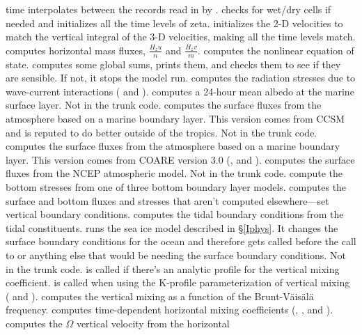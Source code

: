 \begin{klist}
   time interpolates between the records read in by
  .
   checks for wet/dry cells if needed and initializes
  all the time levels of zeta.
   initializes the 2-D velocities to match the
  vertical integral of the 3-D velocities, making all the time levels
  match.
   computes horizontal mass fluxes, $\frac{H_z
  u}{n}$ and $\frac{H_z v}{m}$.
   computes the nonlinear equation of state.
   computes some global sums, prints them, and checks them to
  see if they are sensible. If not, it stops the model run.
   computes the radiation stresses due to
  wave-current interactions (\cite{Mellor_2003} and \cite{Mellor_2005}).
   computes a 24-hour mean albedo at the marine
  surface layer. Not in the trunk code.
   computes the surface fluxes from the atmosphere
  based on a marine boundary layer. This version comes from CCSM and is
  reputed to do better outside of the tropics. Not in the trunk code.
   computes the surface fluxes from the atmosphere
  based on a marine boundary layer. This version comes from COARE
  version 3.0 (\cite{Fairall_2003}, \cite{Taylor_2001} and
  \cite{Oost_2002}).
   computes the surface fluxes from the NCEP
  atmospheric model. Not in the trunk code.
   compute the bottom stresses from one of three bottom
  boundary layer models.
   computes the surface and bottom fluxes and stresses
  that aren't computed elsewhere---set vertical boundary conditions.
   computes the tidal boundary conditions from the
  tidal constituents.
   runs the sea ice model described in \S\ref{Iphys}. It
  changes the surface boundary conditions for the ocean and therefore
  gets called before the call to  or anything else that
  would be needing the surface boundary conditions. Not in the trunk
  code.
   is called if there's an analytic profile for the
  vertical mixing coefficient.
   is called when using the K-profile parameterization
  of vertical mixing (\cite{Large94} and \cite{Large98}).
   computes the vertical mixing as a function of the
  Brunt-V\"ais\"al\"a frequency.
   computes time-dependent horizontal mixing coefficients
  (\cite{S63}, \cite{Holland_98}, \cite{Webb_98} and \cite{Griffies_2000}).
   computes the $\Omega$ vertical velocity from the horizontal

\end{klist}

